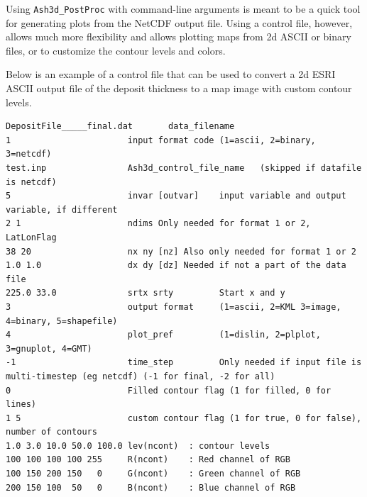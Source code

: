 Using \texttt{Ash3d\_PostProc} with command-line arguments is meant to be a
quick tool for generating plots from the NetCDF output file. Using a control
file, however, allows much more flexibility and allows plotting maps
from 2d ASCII or binary files, or to customize the contour levels and colors.

Below is an example of a control file that can be used to convert a 2d ESRI ASCII
output file of the deposit thickness to a map image with custom contour levels.

\small
\begin{verbatim}
DepositFile_____final.dat       data_filename
1                       input format code (1=ascii, 2=binary, 3=netcdf)
test.inp                Ash3d_control_file_name   (skipped if datafile is netcdf)
5                       invar [outvar]    input variable and output variable, if different
2 1                     ndims Only needed for format 1 or 2, LatLonFlag
38 20                   nx ny [nz] Also only needed for format 1 or 2
1.0 1.0                 dx dy [dz] Needed if not a part of the data file
225.0 33.0              srtx srty         Start x and y
3                       output format     (1=ascii, 2=KML 3=image, 4=binary, 5=shapefile)
4                       plot_pref         (1=dislin, 2=plplot, 3=gnuplot, 4=GMT)
-1                      time_step         Only needed if input file is multi-timestep (eg netcdf) (-1 for final, -2 for all)
0                       Filled contour flag (1 for filled, 0 for lines)
1 5                     custom contour flag (1 for true, 0 for false), number of contours
1.0 3.0 10.0 50.0 100.0 lev(ncont)  : contour levels
100 100 100 100 255     R(ncont)    : Red channel of RGB
100 150 200 150   0     G(ncont)    : Green channel of RGB
200 150 100  50   0     B(ncont)    : Blue channel of RGB
\end{verbatim}
\normalsize

